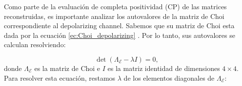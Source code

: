 \documentclass[letterpaper,12pt]{thesisECFM}
\theoremstyle{plain}
\theoremstyle{definition}
\theoremstyle{remark}
\newcommand{\1}{\mathbb{1}}
\begin{document}
\begin{table}[htbp]
\centering 
{}
\caption{Comparación de fidelidad de proceso entre las matrices de Choi
reconstruidas del ansatz optimizado. Los resultados de la computadora cuántica
fueron tomados en \texttt{ibm-kyoto}, mientras que en el simulador fueron en
\texttt{AerSimualtor()} de qiskit. \textbf{Fuente:} elaboración propia.}
\label{tab:comparacion_fidelidades}
\end{table}

Como parte de la evaluación de completa positividad (CP)  de las matrices
reconstruidas, es importante analizar los autovalores de la matriz de Choi
correspondiente al depolarizing channel. Sabemos que su matriz de Choi esta
dada por la ecuación \ref{ec:Choi_depolarizing} . Por lo tanto, sus autovalores
se calculan resolviendo:

\begin{equation}
\det(\Lambda_\mathcal{E} - \lambda I) = 0,
\end{equation}
donde $\Lambda_\mathcal{E}$ es la matriz de Choi e $I$ es la matriz identidad
de dimensiones $4 \times 4$. Para resolver esta ecuación, restamos $\lambda$ de
los elementos diagonales de $\Lambda_\mathcal{E}$:
\end{document}
